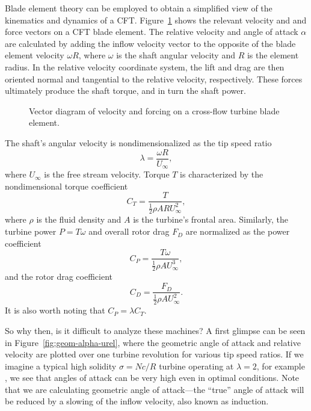 Blade element theory can be employed to obtain a simplified view of the
kinematics and dynamics of a CFT. Figure~\ref{fig:vectors} shows the relevant
velocity and and force vectors on a CFT blade element. The relative velocity and
angle of attack $\alpha$ are calculated by adding the inflow velocity vector to
the opposite of the blade element velocity $\omega R$, where $\omega$ is the
shaft angular velocity and $R$ is the element radius. In the relative velocity
coordinate system, the lift and drag are then oriented normal and tangential to
the relative velocity, respectively. These forces ultimately produce the shaft
torque, and in turn the shaft power. 

\begin{figure}[ht]
    \centering
    
    \caption{Vector diagram of velocity and forcing on a cross-flow turbine
        blade element.}
    
    \label{fig:vectors}
\end{figure}

The shaft's angular velocity is nondimensionalized as the tip speed ratio
\begin{equation}
    \lambda = \frac{\omega R}{U_\infty},
    \label{eq:lambda}
\end{equation}
where $U_\infty$ is the free stream velocity.
Torque $T$ is characterized by the nondimensional torque coefficient 
\begin{equation}
    C_T = \frac{T}{\frac{1}{2} \rho A R U_\infty^2},
    \label{eq:ct}
\end{equation}
where $\rho$ is the fluid density and $A$ is the turbine's frontal area.
Similarly, the turbine power $P = T\omega$ and overall rotor drag $F_D$ are
normalized as the power coefficient
\begin{equation}
    C_P = \frac{T \omega}{\frac{1}{2} \rho A U_\infty^3},
    \label{eq:cp}
\end{equation}
and the rotor drag coefficient
\begin{equation}
    C_D = \frac{F_D}{\frac{1}{2} \rho A U_\infty^2}.
    \label{eq:cd}
\end{equation}
It is also worth noting that $C_P = \lambda C_T$.

So why then, is it difficult to analyze these machines? A first glimpse can be
seen in Figure~\ref{fig:geom-alpha-urel}, where the geometric angle of attack
and relative velocity are plotted over one turbine revolution for various tip
speed ratios. If we imagine a typical high solidity $\sigma = Nc/R$ turbine
operating at $\lambda = 2$, for example \cite{Howell2010}, we see that angles of
attack can be very high even in optimal conditions. Note that we are calculating
geometric angle of attack---the ``true'' angle of attack will be reduced by a
slowing of the inflow velocity, also known as induction. 

